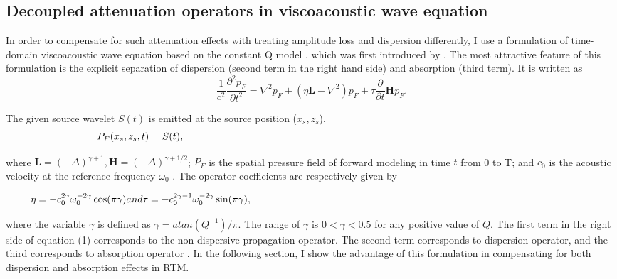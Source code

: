 \subsection{Decoupled attenuation operators in viscoacoustic wave equation}

In order to compensate for such attenuation effects with treating amplitude loss and dispersion differently, I use a formulation of time-domain viscoacoustic wave equation based on the constant Q model \cite[]{kja79}, which was first introduced by \citet[]{zhu14a}. The most attractive feature of this formulation is the explicit separation of dispersion (second term in the right hand side) and absorption (third term). It is written as
\begin{equation}
  \label{eq:frac1}
 \frac{1}{c^2}\frac{\partial^2 p_{F}}{\partial t^2} = \nabla^2 p_{F} +  \left ( \eta \mathbf{L} - \nabla^2 \right ) p_{F}+ \tau \frac{\partial}{\partial t}\mathbf{H} p_{F}.
\end{equation}

The given source wavelet $S(t)$ is emitted at the source position ($x_s,z_s$),
\begin{equation}
\label{eq:eq2}                      
\hspace{0pt} P_{F}(x_s,z_s,t)=S(t),\hspace{\linewidth minus\linewidth}
\end{equation}

where $\mathbf{L}=\left ( -\Delta  \right )^{\gamma +1}, \mathbf{H}=\left ( -\Delta  \right )^{\gamma +1/2}$; $P_F$ is the spatial pressure field of forward modeling in time $t$ from 0 to T; and  $c_0$ is the acoustic velocity at the reference frequency $\omega_0$ . The operator coefficients are respectively given by

\begin{equation}
\label{eq:eq3}                      
\hspace{0pt} \eta = -c_0^{2\gamma}\omega_0^{-2\gamma}\cos(\pi \gamma) and \tau = -c_0^{2\gamma-1}\omega_0^{-2\gamma}\sin(\pi \gamma),\hspace{\linewidth minus\linewidth}
\end{equation}

where the variable $\gamma$ is defined as $\gamma=atan(Q^{-1})/\pi $. The range of $\gamma$ is $0<\gamma<0.5$ for any positive value of $Q$. The first term in the right side of equation (1) corresponds to the non-dispersive propagation operator. The second term corresponds to dispersion operator, and the third corresponds to absorption operator \cite[]{zhu14a}. In the following section, I show the advantage of this formulation in compensating for both dispersion and absorption effects in RTM. 

